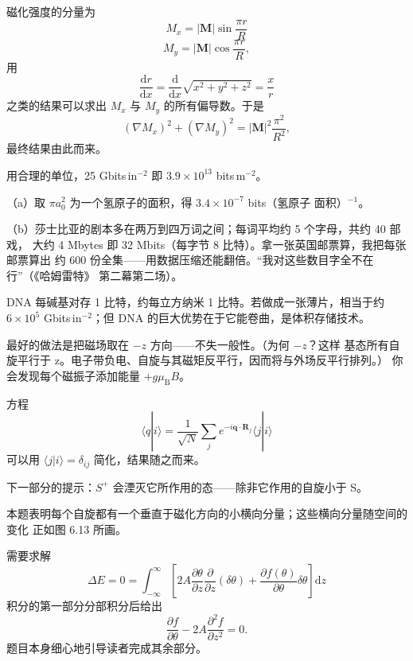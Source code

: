  磁化强度的分量为
\begin{equation*}
M_x = |\mathbf{M}|\sin\frac{\pi r}{R}\tag{F.72}
\end{equation*}
\begin{equation*}
M_y = |\mathbf{M}|\cos\frac{\pi r}{R},\tag{F.73}
\end{equation*}
用
\begin{equation*}
\frac{\mathrm{d}r}{\mathrm{d}x} = \frac{\mathrm{d}}{\mathrm{d}x}\sqrt{x^{2}+y^{2}+z^{2}} = \frac{x}{r}\tag{F.74}
\end{equation*}
之类的结果可以求出 $M_x$ 与 $M_y$ 的所有偏导数。于是
\begin{equation*}
(\nabla M_x)^{2}+(\nabla M_y)^{2} = |\mathbf{M}|^{2}\frac{\pi^{2}}{R^{2}},\tag{F.75}
\end{equation*}
最终结果由此而来。

 用合理的单位，25 Gbits\,in$^{-2}$ 即 $3.9\times10^{13}$ bits\,m$^{-2}$。

（a）取 $\pi a_0^{2}$ 为一个氢原子的面积，得 $3.4\times10^{-7}$ bits（氢原子
面积）$^{-1}$。

（b）莎士比亚的剧本多在两万到四万词之间；每词平均约 5 个字母，共约 40 部戏，
大约 4 Mbytes 即 32 Mbits（每字节 8 比特）。拿一张英国邮票算，我把每张邮票算出
约 600 份全集——用数据压缩还能翻倍。“我对这些数目字全不在行”（《哈姆雷特》
第二幕第二场）。

DNA 每碱基对存 1 比特，约每立方纳米 1 比特。若做成一张薄片，相当于约
$6\times10^{5}$ Gbits\,in$^{-2}$；但 DNA 的巨大优势在于它能卷曲，是体积存储技术。

 最好的做法是把磁场取在 $-z$ 方向——不失一般性。（为何 $-z$？这样
基态所有自旋平行于 z。电子带负电、自旋与其磁矩反平行，因而将与外场反平行排列。）
你会发现每个磁振子添加能量 $+g\mu_{\mathrm{B}}B$。

 方程
\begin{equation*}
\langle q|i\rangle = \frac{1}{\sqrt{N}}\sum_j e^{-i\mathbf{q}\cdot\mathbf{R}_j}\langle j|i\rangle\tag{F.76}
\end{equation*}
可以用 $\langle j|i\rangle=\delta_{ij}$ 简化，结果随之而来。

下一部分的提示：$S^{+}$ 会湮灭它所作用的态——除非它作用的自旋小于 S。

本题表明每个自旋都有一个垂直于磁化方向的小横向分量；这些横向分量随空间的变化
正如图 6.13 所画。

 需要求解
\begin{equation*}
\Delta E = 0 = \int_{-\infty}^{\infty}\left[2A\frac{\partial\theta}{\partial z}\frac{\partial}{\partial z}(\delta\theta) + \frac{\partial f(\theta)}{\partial\theta}\delta\theta\right]\mathrm{d}z\tag{F.77}
\end{equation*}
积分的第一部分分部积分后给出
\begin{equation*}
\frac{\partial f}{\partial\theta} - 2A\frac{\partial^{2}f}{\partial z^{2}} = 0.\tag{F.78}
\end{equation*}
题目本身细心地引导读者完成其余部分。

